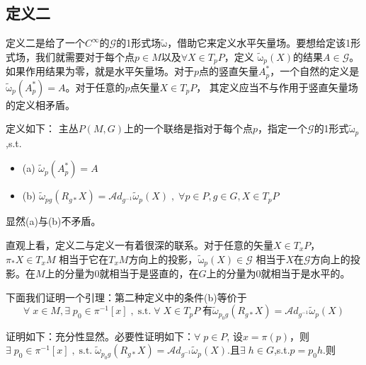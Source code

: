 \documentclass{ctexbook}
\begin{document}
\subsection{定义二}

定义二是给了一个$C^{\infty}$的$\mathscr{G}$的1形式场$\tilde{\mathrm{\omega}}$，借助它来定义水平矢量场。要想给定该1形式场，我们就需要对于每个点$p\in M$以及$\forall X\in T_{p} P$，定义 $\tilde{\mathrm{\omega}}_p(X)$的结果$A\in\mathscr{G}$。如果作用结果为零，就是水平矢量场。对于$p$点的竖直矢量$A^{*}_p$，一个自然的定义是$\tilde{\mathrm{\omega}}_p\left(A^{*}_{p}\right)=A$。对于任意的$p$点矢量$X\in T_p P$， 其定义应当不与作用于竖直矢量场的定义相矛盾。


定义如下：
主丛$P(M,G)$上的一个联络是指对于每个点$p$，指定一个$\mathscr{G}$的1形式$\tilde{\mathrm{\omega}}_p$,s.t.
\begin{itemize}
    \item (a) $\tilde{\omega}_{p}(A^{*}_p)=A$
    \item (b) $\tilde{\omega}_{pg}\left(R_{g*}X\right)=\mathscr{A}d_{g^{-1}}\tilde{\omega}_{p}\left(X\right)\;,\;\forall p\in P, g\in G, X\in T_{p}P$
\end{itemize}
显然(a)与(b)不矛盾。

直观上看，定义二与定义一有着很深的联系。对于任意的矢量$X\in T_{x} P$，$\pi_{*}X\in T_{x}M$ 相当于它在$T_x M$方向上的投影，$\tilde{\mathrm{\omega}}_p(X)\in\mathscr{G}$ 相当于$X$在$\mathscr{G}$方向上的投影。在$M$上的分量为0就相当于是竖直的，在$G$上的分量为0就相当于是水平的。

下面我们证明一个引理：第二种定义中的条件(b)等价于
\begin{equation}
    \forall\;x\in M,\exists\;p_0\in\pi^{-1}[x]\;,\; \text{s.t.}\;\forall\;X\in T_p P\;\text{有}
    \tilde{\mathscr{\omega}}_{p_0g}(R_{g*}X)=\mathscr{A}
    d_{g^{-1}}\tilde{\mathscr{\omega}}_{p}(X)
\end{equation}

证明如下：充分性显然。必要性证明如下：$\forall\;p\in P$, 设$x=\pi(p)$，则$\exists\;p_0\in\pi^{-1}[x]\;,\;\text{s.t.}\;\tilde{\mathscr{\omega}}_{p_0g}(R_{g*}X)=\mathscr{A}d_{g^{-1}}\tilde{\mathscr{\omega}}_{p}(X)$.且$\exists\;h\in G$,s.t.$p=p_0h$.则
\end{document}
